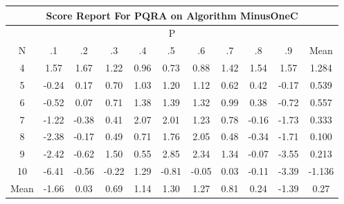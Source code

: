 \documentclass[11pt,a4paper]{report}
\begin{document}
\begin{longtable}{ | c || c | c | c | c | c | c | c | c | c || c |}
\hline
\multicolumn{11}{|c|}{ Score Report For PQRA on Algorithm MinusOneC} \\
\hline
\multicolumn{11}{|c|}{ P } \\
\hline
N & .1 & .2 & .3 & .4 & .5 & .6 & .7 & .8 & .9 & Mean\\
 \hline
 \hline
 \endhead
  4 &  \cellcolor[HTML]{D7D7FF} 1.57 &  \cellcolor[HTML]{D7D7FF} 1.67 &  \cellcolor[HTML]{DFDFFF} 1.22 &  \cellcolor[HTML]{E7E7FF} 0.96 &  \cellcolor[HTML]{EFEFFF} 0.73 &  \cellcolor[HTML]{E7E7FF} 0.88 &  \cellcolor[HTML]{DFDFFF} 1.42 &  \cellcolor[HTML]{D7D7FF} 1.54 &  \cellcolor[HTML]{D7D7FF} 1.57 & 1.284 \\
  5 &  \cellcolor[HTML]{FFF7F7} -0.24 &  \cellcolor[HTML]{F7F7FF} 0.17 &  \cellcolor[HTML]{EFEFFF} 0.70 &  \cellcolor[HTML]{E7E7FF} 1.03 &  \cellcolor[HTML]{DFDFFF} 1.20 &  \cellcolor[HTML]{DFDFFF} 1.12 &  \cellcolor[HTML]{EFEFFF} 0.62 &  \cellcolor[HTML]{F7F7FF} 0.42 &  \cellcolor[HTML]{FFF7F7} -0.17 & 0.539 \\
  6 &  \cellcolor[HTML]{FFEFEF} -0.52 &  \cellcolor[HTML]{FFFFFF} 0.07 &  \cellcolor[HTML]{EFEFFF} 0.71 &  \cellcolor[HTML]{DFDFFF} 1.38 &  \cellcolor[HTML]{DFDFFF} 1.39 &  \cellcolor[HTML]{DFDFFF} 1.32 &  \cellcolor[HTML]{E7E7FF} 0.99 &  \cellcolor[HTML]{F7F7FF} 0.38 &  \cellcolor[HTML]{FFEFEF} -0.72 & 0.557 \\
  7 &  \cellcolor[HTML]{FFDFDF} -1.22 &  \cellcolor[HTML]{FFF7F7} -0.38 &  \cellcolor[HTML]{F7F7FF} 0.41 &  \cellcolor[HTML]{C7C7FF} 2.07 &  \cellcolor[HTML]{CFCFFF} 2.01 &  \cellcolor[HTML]{DFDFFF} 1.23 &  \cellcolor[HTML]{EFEFFF} 0.78 &  \cellcolor[HTML]{FFF7F7} -0.16 &  \cellcolor[HTML]{FFD7D7} -1.73 & 0.333 \\
  8 &  \cellcolor[HTML]{FFBFBF} -2.38 &  \cellcolor[HTML]{FFF7F7} -0.17 &  \cellcolor[HTML]{EFEFFF} 0.49 &  \cellcolor[HTML]{EFEFFF} 0.71 &  \cellcolor[HTML]{CFCFFF} 1.76 &  \cellcolor[HTML]{CFCFFF} 2.05 &  \cellcolor[HTML]{EFEFFF} 0.48 &  \cellcolor[HTML]{FFF7F7} -0.34 &  \cellcolor[HTML]{FFD7D7} -1.71 & 0.100 \\
  9 &  \cellcolor[HTML]{FFBFBF} -2.42 &  \cellcolor[HTML]{FFEFEF} -0.62 &  \cellcolor[HTML]{D7D7FF} 1.50 &  \cellcolor[HTML]{EFEFFF} 0.55 &  \cellcolor[HTML]{B7B7FF} 2.85 &  \cellcolor[HTML]{C7C7FF} 2.34 &  \cellcolor[HTML]{DFDFFF} 1.34 &  \cellcolor[HTML]{FFFFFF} -0.07 &  \cellcolor[HTML]{FFA7A7} -3.55 & 0.213 \\
  10 &  \cellcolor[HTML]{FF6060} -6.41 &  \cellcolor[HTML]{FFEFEF} -0.56 &  \cellcolor[HTML]{FFF7F7} -0.22 &  \cellcolor[HTML]{DFDFFF} 1.29 &  \cellcolor[HTML]{FFE7E7} -0.81 &  \cellcolor[HTML]{FFFFFF} -0.05 &  \cellcolor[HTML]{FFFFFF} 0.03 &  \cellcolor[HTML]{FFFFFF} -0.11 &  \cellcolor[HTML]{FFA7A7} -3.39 & -1.136 \\
 \hline
 \hline
Mean &  \cellcolor[HTML]{FFD7D7} -1.66 &  \cellcolor[HTML]{FFFFFF} 0.03 &  \cellcolor[HTML]{EFEFFF} 0.69 &  \cellcolor[HTML]{DFDFFF} 1.14 &  \cellcolor[HTML]{DFDFFF} 1.30 &  \cellcolor[HTML]{DFDFFF} 1.27 &  \cellcolor[HTML]{E7E7FF} 0.81 &  \cellcolor[HTML]{F7F7FF} 0.24 &  \cellcolor[HTML]{FFDFDF} -1.39 &  \cellcolor[HTML]{F7F7FF} 0.27
\end{longtable}
\end{document}
